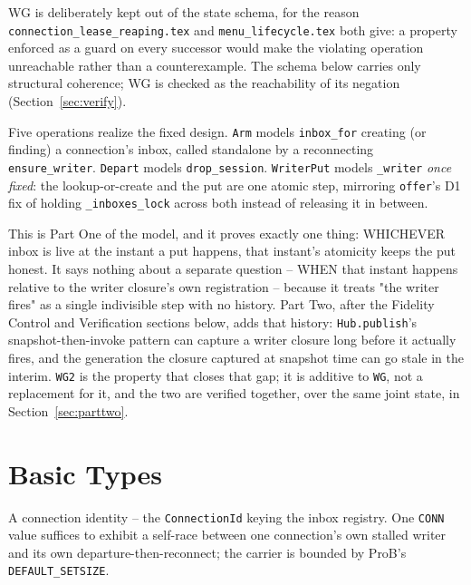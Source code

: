 \documentclass[a4paper,10pt,fleqn]{article}
\begin{document}
WG is deliberately kept out of the state schema, for the reason
\texttt{connection\_lease\_reaping.tex} and \texttt{menu\_lifecycle.tex}
both give: a property enforced as a guard on every successor would make the
violating operation unreachable rather than a counterexample. The schema
below carries only structural coherence; WG is checked as the reachability
of its negation (Section~\ref{sec:verify}).

Five operations realize the fixed design. \texttt{Arm} models
\texttt{inbox\_for} creating (or finding) a connection's inbox, called
standalone by a reconnecting \texttt{ensure\_writer}. \texttt{Depart} models
\texttt{drop\_session}. \texttt{WriterPut} models \texttt{\_writer}
\emph{once fixed}: the lookup-or-create and the put are one atomic step,
mirroring \texttt{offer}'s D1 fix of holding \texttt{\_inboxes\_lock} across
both instead of releasing it in between.

This is Part One of the model, and it proves exactly one thing: WHICHEVER
inbox is live at the instant a put happens, that instant's atomicity keeps
the put honest. It says nothing about a separate question -- WHEN that
instant happens relative to the writer closure's own registration -- because
it treats "the writer fires" as a single indivisible step with no history.
Part Two, after the Fidelity Control and Verification sections below, adds
that history: \texttt{Hub.publish}'s snapshot-then-invoke pattern can capture
a writer closure long before it actually fires, and the generation the
closure captured at snapshot time can go stale in the interim. \texttt{WG2}
is the property that closes that gap; it is additive to \texttt{WG}, not a
replacement for it, and the two are verified together, over the same joint
state, in Section~\ref{sec:parttwo}.

\section{Basic Types}

\begin{zed}
  [CONN]
\end{zed}

A connection identity -- the \texttt{ConnectionId} keying the inbox
registry. One \texttt{CONN} value suffices to exhibit a self-race between
one connection's own stalled writer and its own departure-then-reconnect;
the carrier is bounded by ProB's \texttt{DEFAULT\_SETSIZE}.
\end{document}
